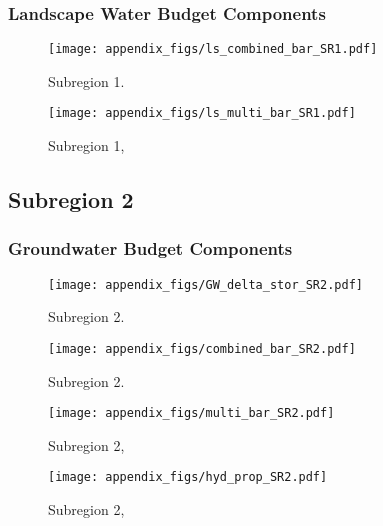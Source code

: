\subsubsection{Landscape Water Budget Components}
\begin{figure}[ht]
\centerline{\texttt{[image: appendix\_figs/ls\_combined\_bar\_SR1.pdf]}}
\caption{\LSCombinedTextOne Subregion 1.\LSCombinedTextTwo}
\label{fig:LS_budget_SR1}
\end{figure}
\newpage

\begin{landscape}
\begin{figure}[ht]
\centerline{\texttt{[image: appendix\_figs/ls\_multi\_bar\_SR1.pdf]}}
\caption{\LSMultiTextOne Subregion 1,\LSMultiTextTwo}
\label{fig:multi_LS_budget_SR1}
\end{figure}
\newpage
\end{landscape}

\subsection{Subregion 2}
\subsubsection{Groundwater Budget Components}
\begin{figure}[h]
\centerline{\texttt{[image: appendix\_figs/GW\_delta\_stor\_SR2.pdf]}}
\caption{\GWBudgetText Subregion 2.}
\label{fig:delta_stor_SR2}
\end{figure}
\newpage

\begin{figure}[ht]
\centerline{\texttt{[image: appendix\_figs/combined\_bar\_SR2.pdf]}}
\caption{\GWCombinedTextOne Subregion 2.\GWCombinedTextTwo}
\label{fig:GW_budget_SR2}
\end{figure}
\newpage

\begin{landscape}
\begin{figure}[ht]
\centerline{\texttt{[image: appendix\_figs/multi\_bar\_SR2.pdf]}}
\caption{\GWMultiTextOne Subregion 2,\GWMultiTextTwo}
\label{fig:multi_GW_budget_SR2}
\end{figure}
\newpage

\begin{figure}[ht]
\centerline{\texttt{[image: appendix\_figs/hyd\_prop\_SR2.pdf]}}
\caption{\HydPropOne Subregion 2,\HydPropTwo}
\label{fig:hyd_prop_SR2}
\end{figure}
\newpage
\end{landscape}

